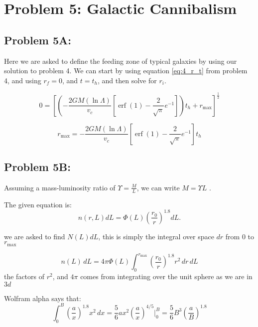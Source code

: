 \section*{Problem 5: Galactic Cannibalism}

\subsection*{Problem 5A:}

Here we are asked to define the feeding zone of typical galaxies by using our solution to problem 4.  We can start by using equation \ref{eq:4_r_t} from problem 4, and using $r_f = 0$, and $t = t_h$, and then solve for $r_i$. 

\begin{equation} 
    0 = [(-\frac{2GM(\ln \Lambda)}{v_c}[\operatorname{erf}(1) - \frac{2}  {\sqrt{\pi}}e^{-1}])t_h + r_{\mathrm{max}}]^{\frac{1}{2}}
\end{equation}


\begin{equation} \label{eq:5_r_max}
\boxed{r_\mathrm{max} = -\frac{2GM(\ln \Lambda)}{v_c}[\operatorname{erf}(1) - \frac{2}  {\sqrt{\pi}}e^{-1}] t_h}
\end{equation}


\subsection*{Problem 5B:}

Assuming a  mass-luminosity ratio of $\Upsilon = \frac{M}{L}$, we can write $M = \Upsilon L$ .

The given equation is:
\begin{equation}
    n(r, L)dL = \Phi(L)(\frac{r_0}{r})^{1.8}dL.
\end{equation}

we are asked to find $N(L)dL$, this is simply the integral over space $dr$ from 0 to $r_{\mathrm{max}}$

\begin{equation}
    n(L)\,dL = 4 \pi \Phi(L) \int_{0}^{r_{\mathrm{max}}} \left(\frac{r_0}{r}\right)^{1.8} r^2\, dr \, dL
\end{equation}
the factors of $r^2$, and $4 \pi$ comes from integrating over the unit sphere as we are in $3d$

Wolfram alpha says that:
\begin{equation}
    \int_0^B (\frac{a}{x})^{1.8}x^2 \, dx = \frac{5}{6}ax^2 (\frac{a}{x})^{4/5}|_0^B = \frac{5}{6} B^3(\frac{a}{B})^{1.8}
\end{equation}

